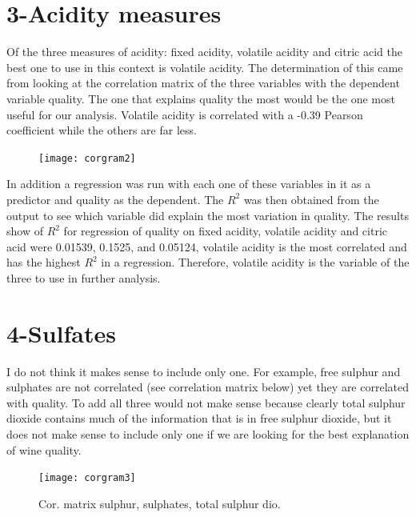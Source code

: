 \documentclass[]{article}
\begin{document}
\section*{3-Acidity measures}
Of the three measures of acidity: fixed acidity, volatile acidity and citric acid the best one to use in this context is volatile acidity. The determination of this came from looking at the correlation matrix of the three variables with the dependent variable quality. The one that explains quality the most would be the one most useful for our analysis. Volatile acidity is correlated with a -0.39 Pearson coefficient while the others are far less. 
\begin{figure}
	\texttt{[image: corgram2]}
\end{figure}	
In addition a regression was run with each one of these variables in it as a predictor and quality as the dependent. The $ R^2 $ was then obtained from the output to see which variable did explain the most variation in quality. The results show of $ R^2 $ for regression of quality on fixed acidity, volatile acidity and citric acid were 0.01539, 0.1525, and  0.05124, volatile acidity is the most correlated and has the highest $ R^2 $ in a regression. Therefore, volatile acidity is the variable of the three to use in further analysis.  
	
\section*{4-Sulfates}
	I do not think it makes sense to include only one. For example, free sulphur and sulphates are not correlated (see correlation matrix below) yet they are correlated with quality. To add all three would not make sense because clearly total sulphur dioxide contains much of the information that is in free sulphur dioxide, but it does not make sense to include only one if we are looking for the best explanation of wine quality. 	
\begin{figure}[H]
	\centering
	\texttt{[image: corgram3]}
	\caption{Cor. matrix sulphur, sulphates, total sulphur dio.}
\end{figure}	

	
\end{document}
